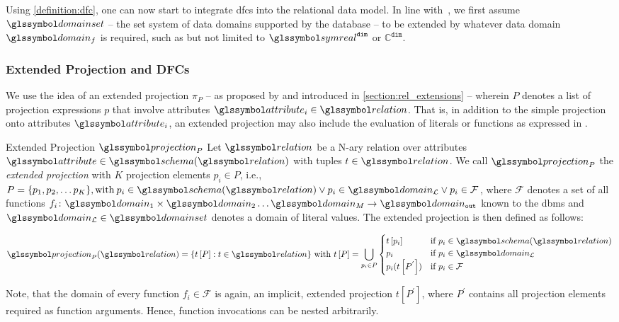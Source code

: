Using \cref{definition:dfc}, one can now start to integrate \acrshort{dfc}s into the relational data model. In line with~\cite{Giangreco:2018Database}, we first assume $\domainset$ -- the set system of data domains supported by the database -- to be extended by whatever data domain $\domain_f$ is required, such as but not limited to $\symreal^{\mathtt{dim}}$ or $\mathbb{C}^{\mathtt{dim}}$. 

\subsubsection{Extended Projection and DFCs}

We use the idea of an extended projection $\pi_{P}$ -- as proposed by \cite{Gupta:1995Generalized,Garcia:2009Database} and introduced in \cref{section:rel_extensions} -- wherein $P$ denotes a list of projection expressions $p$ that involve attributes $\attribute_i \in \relation$. That is, in addition to the simple projection onto attributes $\attribute_i$, an extended projection may also include the evaluation of literals or functions as expressed in . 

\begin{definition}[label=definition:extended_projection]{Extended Projection $\projection_P$}{}
Let $\relation$ be a N-ary relation over attributes $\attribute \in \schema (\relation)$ with tuples $t \in \relation$. We call $\projection_{P}$ the \emph{extended projection} with $K$ projection elements $p_i \in P$, i.e., $P = \{ p_1, p_2, \ldots p_K \}, \textrm{with} \: p_i \in \schema(\relation) \vee p_i \in \domain_{\mathcal{L}} \vee p_i \in \mathcal{F}$, where $\mathcal{F}$ denotes a set of all functions $f_i \colon \domain_{1} \times \domain_{2} \ldots \domain_{M} \rightarrow \domain_{\mathtt{out}}$ known to the \acrshort{dbms} and $\domain_{\mathcal{L}} \in \domainset$ denotes a domain of literal values. The extended projection is then defined as follows:

\begin{equation*}
    \projection_{P}(\relation) =  \{ t\left[ P \right] : t \in \relation \} \textrm{ with } t\left[ P \right] = \bigcup_{p_i \in P }
    \begin{cases} 
        t \left[ p_i \right] & \text{if } p_i \in \schema(\relation) \\
        p_i  & \text{if } p_i \in \domain_{\mathcal{L}} \\
        p_i(t \left[ P^{'} \right]) & \text{if } p_i \in \mathcal{F} \\
    \end{cases}
\end{equation*}

Note, that the domain of every function $f_i \in \mathcal{F}$ is again, an implicit, extended projection $t \left[ P^{'}\right]$, where $P^{'}$ contains all projection elements required as function arguments. Hence, function invocations can be nested arbitrarily.

\end{definition}

